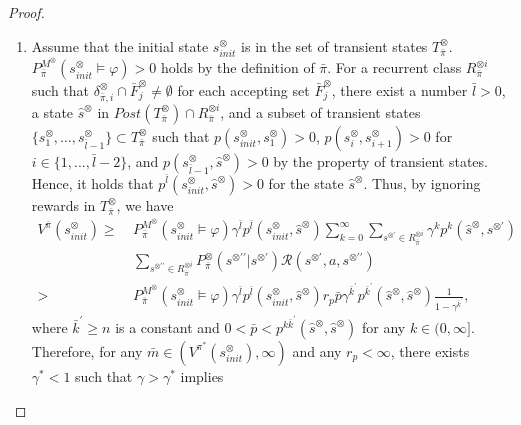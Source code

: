 \documentclass[a4j,12pt,oneside,openany,english]{jsbook}
\begin{document}
\begin{proof}
\begin{enumerate}
    \item Assume that the initial state $s^{\otimes}_{init}$ is in the set of transient states $T_{\bar{\pi}}^{\otimes}$.
    $P^{M^{\otimes}}_{\bar{\pi}}(s^{\otimes}_{init} \models \varphi) > 0$ holds by the definition of $\bar{\pi}$. For a recurrent class $R^{\otimes i}_{\bar{\pi}}$ such that $\delta^{\otimes}_{\bar{\pi}, i} \cap \bar{F}^{\otimes}_j \neq \emptyset$ for each accepting set
    $\bar{F}^{\otimes}_j$, there exist a number $\bar{l} > 0$, a state $\hat{s}^{\otimes}$ in $Post(T^{\otimes}_{\bar{\pi}}) \cap R^{\otimes i}_{\bar{\pi}}$, and a subset of transient states $\{ s^{\otimes}_1, \ldots , s^{\otimes}_{\bar{l}-1} \} \subset T^\otimes_{\bar{\pi}}$ such that $p(s^{\otimes}_{init}, s^{\otimes}_1)>0$, $p(s^{\otimes}_{i}, s^{\otimes}_{i+1})>0$ for $i \in \{ 1,...,\bar{l}-2 \}$, and $p(s^{\otimes}_{\bar{l}-1}, \hat{s}^{\otimes})>0$ by the property of transient states.
    Hence, it holds that $p^{\bar{l}}(s^{\otimes}_{init}, \hat{s}^{\otimes}) > 0$ for the state $\hat{s}^{\otimes}$. Thus, by ignoring rewards in $T^{\otimes}_{\bar{\pi}}$, we have
     \begin{align}
        V^{\bar{\pi}}(s^{\otimes}_{init})
        \geq\ & P^{M^{\otimes}}_{\bar{\pi}}(s^{\otimes}_{init} \models \varphi)  \gamma^{\bar{l}} p^{\bar{l}}(s^{\otimes}_{init}, \hat{s}^{\otimes})  \sum_{k=0}^{\infty} \sum_{s^{\otimes \prime} \in R^{\otimes i}_{\bar{\pi}}} \gamma^k p^k(\hat{s}^{\otimes}, s^{\otimes \prime}) \nonumber \\
         & \sum_{s^{\otimes \prime \prime} \in R^{\otimes i}_{\bar{\pi}}} P^{\otimes}_{\bar{\pi}}(s^{\otimes \prime \prime} | s^{\otimes \prime}) \mathcal{R}(s^{\otimes \prime}, a, s^{\otimes \prime \prime}) \nonumber \\
        >\ & P^{M^{\otimes}}_{\bar{\pi}}(s^{\otimes}_{init} \models \varphi)  \gamma^{\bar{l}} p^{\bar{l}}(s^{\otimes}_{init}, \hat{s}^{\otimes}) r_p \bar{p} \gamma^{\bar{k}^{\prime}}  p^{\bar{k}^{\prime}}(\hat{s}^{\otimes},\hat{s}^{\otimes}) \frac{1}{ 1 - \gamma^{\bar{k}^{\prime}} }, \nonumber
     \end{align}
     where $\bar{k}^{\prime}  \geq n$ is a constant and $0<\bar{p}< p^{k \bar{k}^{\prime}}(\hat{s}^{\otimes}, \hat{s}^{\otimes})$ for any $k \in (0, \infty]$.
     Therefore, for any $\bar{m} \in (V^{\pi^{\ast}}(s^{\otimes}_{init}), \infty)$ and any $r_p < \infty$, there exists $\gamma^{\ast}<1$ such that $\gamma > \gamma^{\ast}$ implies

\end{enumerate}
\end{proof}
\end{document}
